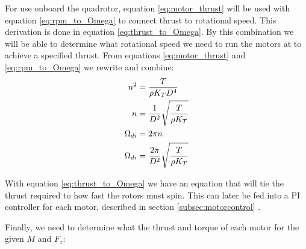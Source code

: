 \documentclass{article}
\numberwithin{equation}{section} %
\begin{document}
For use onboard the quadrotor, equation \eqref{eq:motor_thrust} will be used with equation \eqref{eq:rpm_to_Omega} to connect thrust to rotational speed. This derivation is done in equation \eqref{eq:thrust_to_Omega}. By this combination we will be able to determine what rotational speed we need to run the motors at to achieve a specified thrust. From equations \eqref{eq:motor_thrust} and \eqref{eq:rpm_to_Omega} we rewrite and combine:
\begin{align}
	n^2 	&= \frac{T}{\rho K_T D^4} \notag \\
	n		&= \frac{1}{D^2} \sqrt{\frac{T}{\rho K_T}} \notag \\
	\Omega_{di}	&= 2 \pi n \notag \\	
	\Omega_{di}	&= \frac{2 \pi}{D^2} \sqrt{\frac{T}{\rho K_T}} \label{eq:thrust_to_Omega}
\end{align}

With equation \eqref{eq:thrust_to_Omega} we have an equation that will tie the thrust required to how fast the rotors must spin. This can later be fed into a PI controller for each motor, described in section \ref{subsec:motorcontrol} .

Finally, we need to determine what the thrust and torque of each motor for the given $M$ and $F_z$:
\end{document}
